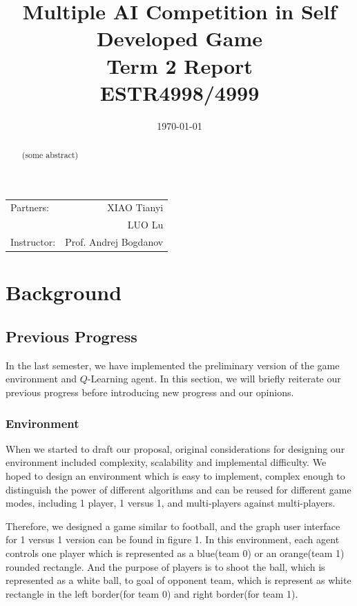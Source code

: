 \documentclass[12pt]{article}
\title{\large Multiple AI Competition in Self Developed Game \\ Term 2 Report \\ ESTR4998/4999} %
\date{\today} %
\begin{document}
\maketitle %

\begin{center}
\begin{tabular}{l r}
Partners: & XIAO Tianyi \\ %
& LUO Lu \\
Instructor: & Prof. Andrej Bogdanov %
\end{tabular}
\end{center}
\newpage



\begin{abstract}
	(some abstract)
\end{abstract}
 
\section{Background}

\subsection{Previous Progress}
In the last semester, we have implemented the preliminary version of the game environment and $Q$-Learning agent. In this section, we will briefly reiterate our previous progress before introducing new progress and our opinions.
\subsubsection{Environment}
When we started to draft our proposal, original considerations for designing our environment included complexity, scalability and implemental difficulty. We hoped to design an environment which is easy to implement, complex enough to distinguish the power of different algorithms and can be reused for different game modes, including 1 player, 1 versus 1, and multi-players against multi-players.

Therefore, we designed a game similar to football, and the graph user interface for 1 versus 1 version can be found in figure 1. In this environment, each agent controls one player which is represented as a blue(team 0) or an orange(team 1) rounded rectangle. And the purpose of players is to shoot the ball, which is represented as a white ball, to goal of opponent team, which is represent as white rectangle in the left border(for team 0) and right border(for team 1).
\end{document}
